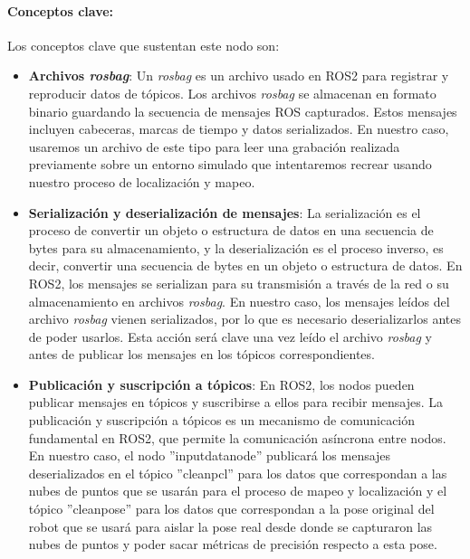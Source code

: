 \documentclass[12pt, a4paper, twoside]{article}
\begin{document}
\paragraph{Conceptos clave:}
Los conceptos clave que sustentan este nodo son:
\begin{itemize}
  \item \textbf{Archivos \textit{rosbag}}: Un \textit{rosbag} es un archivo usado en ROS2 \cite{doi:10.1126/scirobotics.abm6074} para registrar y reproducir datos de tópicos. Los 
  archivos \textit{rosbag} se almacenan en formato binario guardando la secuencia de mensajes ROS capturados. Estos mensajes incluyen cabeceras, marcas de tiempo 
  y datos serializados. En nuestro caso, usaremos un archivo de este tipo para leer una grabación realizada previamente sobre un entorno simulado que 
  intentaremos recrear usando nuestro proceso de localización y mapeo.
  \item \textbf{Serialización y deserialización de mensajes}: La serialización es el proceso de convertir un objeto o estructura de datos en una secuencia 
  de bytes para su almacenamiento, y la deserialización es el proceso inverso, es decir, convertir una secuencia de bytes en un objeto o estructura de datos. 
  En ROS2\cite{doi:10.1126/scirobotics.abm6074}, los mensajes se serializan para su transmisión a través de la red o su almacenamiento en archivos \textit{rosbag}. En nuestro caso, los mensajes leídos del 
  archivo \textit{rosbag} vienen serializados, por lo que es necesario deserializarlos antes de poder usarlos. Esta acción será clave una vez leído el archivo \textit{rosbag} 
  y antes de publicar los mensajes en los tópicos correspondientes.
  \item \textbf{Publicación y suscripción a tópicos}: En ROS2\cite{doi:10.1126/scirobotics.abm6074}, los nodos pueden publicar mensajes en tópicos y suscribirse a ellos para recibir mensajes.
  La publicación y suscripción a tópicos es un mecanismo de comunicación fundamental en ROS2, que permite la comunicación asíncrona entre nodos. En nuestro caso, 
  el nodo ''input\textunderscore data\textunderscore node'' publicará los mensajes deserializados en el tópico ''clean\textunderscore pcl'' para los datos que 
  correspondan a las nubes de puntos que se usarán para el proceso de mapeo y localización y el tópico ''clean\textunderscore pose'' para los datos que correspondan 
  a la pose original del robot que se usará para aislar la pose real desde donde se capturaron las nubes de puntos y poder sacar métricas de precisión respecto a 
  esta pose.  
\end{itemize}
\end{document}
